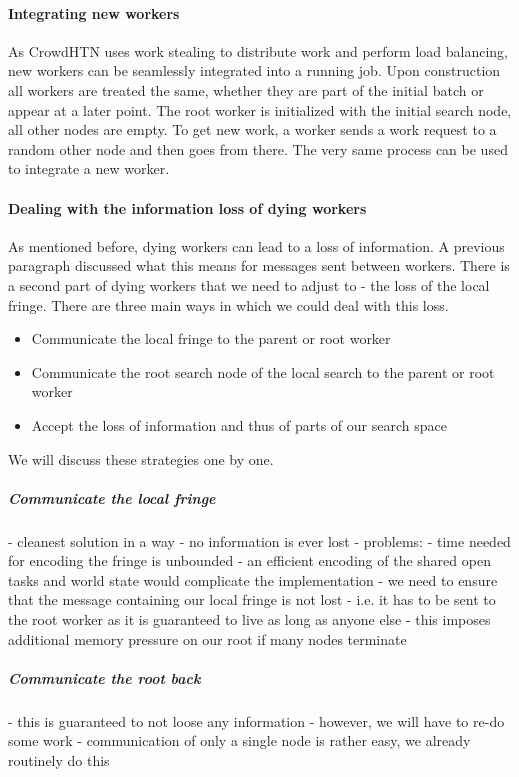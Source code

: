 \paragraph{Integrating new workers}
As CrowdHTN uses work stealing to distribute work and perform load balancing, new workers can be seamlessly integrated into a running job. Upon construction all workers are treated the same, whether they are part of the initial batch or appear at a later point. The root worker is initialized with the initial search node, all other nodes are empty. To get new work, a worker sends a work request to a random other node and then goes from there. The very same process can be used to integrate a new worker.
\paragraph{Dealing with the information loss of dying workers}
As mentioned before, dying workers can lead to a loss of information. A previous paragraph discussed what this means for messages sent between workers. There is a second part of dying workers that we need to adjust to - the loss of the local fringe. There are three main ways in which we could deal with this loss.
\begin{itemize}
	\item Communicate the local fringe to the parent or root worker
	\item Communicate the root search node of the local search to the parent or root worker
	\item Accept the loss of information and thus of parts of our search space
\end{itemize}
We will discuss these strategies one by one.
\subparagraph{Communicate the local fringe}
- cleanest solution in a way
- no information is ever lost
- problems:
	- time needed for encoding the fringe is unbounded
	- an efficient encoding of the shared open tasks and world state would complicate the implementation
	- we need to ensure that the message containing our local fringe is not lost
		- i.e. it has to be sent to the root worker as it is guaranteed to live as long as anyone else
		- this imposes additional memory pressure on our root if many nodes terminate
\subparagraph{Communicate the root back}
- this is guaranteed to not loose any information
- however, we will have to re-do some work
- communication of only a single node is rather easy, we already routinely do this
